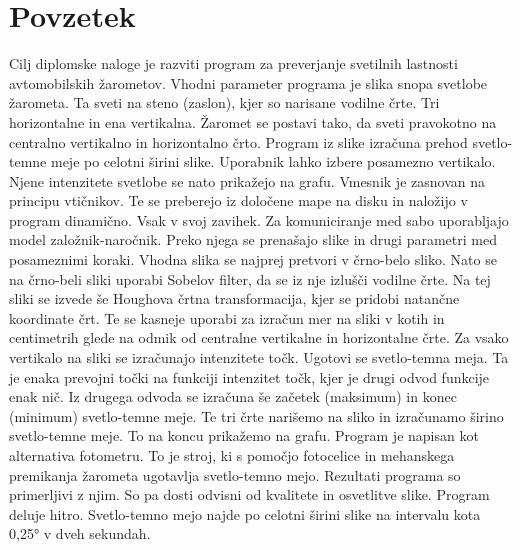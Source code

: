 \documentclass[oneside, a4paper, 12pt]{book}
\renewcommand{\chaptermark}[1]%
{\markboth{\MakeUppercase{\thechapter.\ #1}}{}} \renewcommand{\sectionmark}[1]%
\newcommand{\clearemptydoublepage}{\newpage{\pagestyle{empty}\cleardoublepage}}
\begin{document}
\def\thepage{}%
\tableofcontents{}


\clearemptydoublepage

\chapter*{Povzetek}
\chaptermark{}
Cilj diplomske naloge je razviti program za preverjanje svetilnih lastnosti avtomobilskih žarometov. Vhodni parameter programa je slika snopa svetlobe žarometa. Ta sveti na steno (zaslon), kjer so narisane vodilne črte. Tri horizontalne in ena vertikalna. Žaromet se postavi tako, da sveti pravokotno na centralno vertikalno in horizontalno črto. Program iz slike izračuna prehod svetlo-temne meje po celotni širini slike. Uporabnik lahko izbere posamezno vertikalo. Njene intenzitete svetlobe se nato prikažejo na grafu. Vmesnik je zasnovan na principu vtičnikov. Te se preberejo iz določene mape na disku in naložijo v program dinamično. Vsak v svoj zavihek. Za komuniciranje med sabo uporabljajo model založnik-naročnik. Preko njega se prenašajo slike in drugi parametri med posameznimi koraki. Vhodna slika se najprej pretvori v črno-belo sliko. Nato se na črno-beli sliki uporabi Sobelov filter, da se iz nje izlušči vodilne črte. Na tej sliki se izvede še Houghova črtna transformacija, kjer se pridobi natančne koordinate črt. Te se kasneje uporabi za izračun mer na sliki v kotih in centimetrih glede na odmik od centralne vertikalne in horizontalne črte. Za vsako vertikalo na sliki se izračunajo intenzitete točk. Ugotovi se svetlo-temna meja. Ta je enaka prevojni točki na funkciji intenzitet točk, kjer je drugi odvod funkcije enak nič. Iz drugega odvoda se izračuna še začetek (maksimum) in konec (minimum) svetlo-temne meje. Te tri črte narišemo na sliko in izračunamo širino svetlo-temne meje. To na koncu prikažemo na grafu. Program je napisan kot alternativa fotometru. To je stroj, ki s pomočjo fotocelice in mehanskega premikanja žarometa ugotavlja svetlo-temno mejo. Rezultati programa so primerljivi z njim. So pa dosti odvisni od kvalitete in osvetlitve slike. Program deluje hitro. Svetlo-temno mejo najde po celotni širini slike na intervalu kota 0,25° v dveh sekundah.
\clearemptydoublepage

\end{document}
